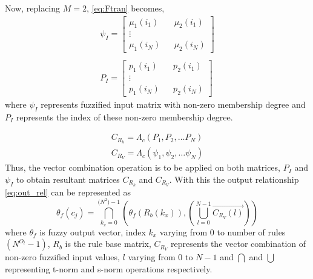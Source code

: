 Now, replacing $ M = 2 $, \eqref{eq:Ftran} becomes,
\begin{equation} \label{eq:FRHC_O}
\begin{array}{*{20}{c}}
{\psi _I} = \left[ {\begin{array}{*{20}{c}}
	{{\mu _1}\left( {{i_1}} \right)}&{}&{{\mu _2}\left( {{i_1}} \right)}\\
	\vdots &{}&{}\\
	{{\mu _1}\left( {{i_N}} \right)}&{}&{{\mu _2}\left( {{i_N}} \right)}
	\end{array}} \right] \\~ \\
{P_I} = \left[ {\begin{array}{*{20}{c}}
	{{p_1}\left( {{i_1}} \right)}&{}&{{p_2}\left( {{i_1}} \right)}\\
	\vdots &{}&{}\\
	{{p_1}\left( {{i_N}} \right)}&{}&{{p_2}\left( {{i_N}} \right)}
	\end{array}} \right]
\end{array}
\end{equation}
where $ {\psi _I} $ represents fuzzified input matrix with non-zero membership degree and $ P_I $ represents the index of these non-zero membership degree. 

\[\begin{array}{l}
{C_{{R_k}}} = {\Lambda _c}\left( {{P_1},{P_2}, \ldots {P_N}} \right)\\
{C_{{R_V}}} = {\Lambda _c}\left( {{\psi _1},{\psi _2}, \ldots {\psi _N}} \right)
\end{array}\]
Thus, the vector combination operation is to be applied on both matrices, $ P_I $ and $ \psi _I $ to obtain resultant matrices $ {C_{{R_k}}} $ and $ {C_{{R_V}}}  $.
With this the output relationship \eqref{eq:out_rel} can be represented as
\begin{equation} \label{eq:FRHC-final}
{\theta _f}({c_j}) = \bigcap\limits_{{k_x} = 0}^{({N^{{2}}) } - 1} {\left( {{\theta _f}\left( {{R_b}\left( {{k_x}} \right)} \right),\left( {\bigcup\limits_{l = 0}^{N - 1} {\overrightarrow {{C_{{R_V}}}\left( l \right)} } } \right)} \right)} 
\end{equation}
where $ {\theta _f} $ is  fuzzy output vector, index $ k_x $ varying from $ 0  $ to number of rules $ (N^{O_l} - 1) $, $ R_b $ is the rule base matrix, $ C_{R_V} $ represents the vector combination of non-zero fuzzified input values, $ l $ varying from $ 0 $ to $ N-1 $ and $ \bigcap {} $  and $ \bigcup {} $ representing t-norm and s-norm operations respectively.

